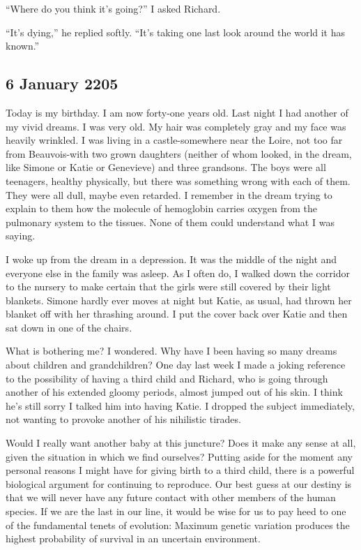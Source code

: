 \documentclass[]{article}
\begin{document}
“Where do you think it’s going?” I asked Richard.

“It’s dying,” he replied softly.  “It’s taking one last look around the world it has known.”

\subsection*{6 January 2205}

Today is my birthday.  I am now forty-one years old.  Last night I had another of my vivid dreams.  I was very old.  My hair was completely gray and my face was heavily wrinkled.  I was living in a castle-somewhere near the Loire, not too far from Beauvois-with two grown daughters (neither of whom looked, in the dream, like Simone or Katie or Genevieve) and three grandsons.  The boys were all teenagers, healthy physically, but there was something wrong with each of them.  They were all dull, maybe even retarded.  I remember in the dream trying to explain to them how the molecule of hemoglobin carries oxygen from the pulmonary system to the tissues.  None of them could understand what I was saying.

I woke up from the dream in a depression.  It was the middle of the night and everyone else in the family was asleep.  As I often do, I walked down the corridor to the nursery to make certain that the girls were still covered by their light blankets.  Simone hardly ever moves at night but Katie, as usual, had thrown her blanket off with her thrashing around.  I put the cover back over Katie and then sat down in one of the chairs.

What is bothering me? I wondered.  Why have I been having so many dreams about children and grandchildren? One day last week I made a joking reference to the possibility of having a third child and Richard, who is going through another of his extended gloomy periods, almost jumped out of his skin.  I think he’s still sorry I talked him into having Katie.  I dropped the subject immediately, not wanting to provoke another of his nihilistic tirades.

Would I really want another baby at this juncture? Does it make any sense at all, given the situation in which we find ourselves? Putting aside for the moment any personal reasons I might have for giving birth to a third child, there is a powerful biological argument for continuing to reproduce.  Our best guess at our destiny is that we will never have any future contact with other members of the human species.  If we are the last in our line, it would be wise for us to pay heed to one of the fundamental tenets of evolution: Maximum genetic variation produces the highest probability of survival in an uncertain environment.
\end{document}
